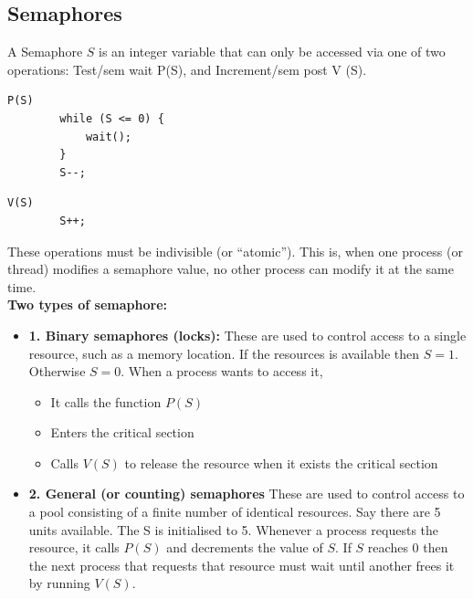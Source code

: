 \documentclass[a4paper, 10pt]{article}
\begin{document}
\subsection{Semaphores}
\begin{definitionbox}{}{}
    A Semaphore $S$ is an integer variable that can only be accessed via one of two operations: Test/sem wait P(S), and Increment/sem post V (S). \\
    \begin{minipage}{0.48\textwidth}
        \begin{lstlisting}[style=CStyle, caption={Test or Sem\_wait}]
        P(S)
        while (S <= 0) {
            wait();
        }
        S--; 
    \end{lstlisting}
    \end{minipage}
    \begin{minipage}{0.48\textwidth}
        \begin{lstlisting}[style=CStyle, caption={Test/Sem\_wait}]
        V(S)
        S++; 
    \end{lstlisting}
    \end{minipage}
\end{definitionbox}
These operations must be indivisible (or “atomic”). This is, when one process (or thread) modifies a semaphore value, no other process can modify it at the same time.\\[2ex]
\textbf{Two types of semaphore:}
\begin{itemize}
    \item \textbf{1. Binary semaphores (locks):} These are used to control access to a single resource, such as a memory location. If the resources is available then $S = 1$. Otherwise $S = 0$. When a process wants to access it,
          \begin{itemize}
              \item It calls the function $P(S)$
              \item Enters the critical section
              \item Calls $V(S)$ to release the resource when it exists the critical section
          \end{itemize}
    \item \textbf{2. General (or counting) semaphores}
          These are used to control access to a pool consisting of a finite number of identical resources. Say there are 5 units available. The S is initialised to 5. Whenever a process requests the resource, it calls $P(S)$ and decrements the value of $S$. If $S$ reaches $0$ then the next process that requests that resource must wait until another frees it by running $V(S)$.
\end{itemize}
\end{document}
